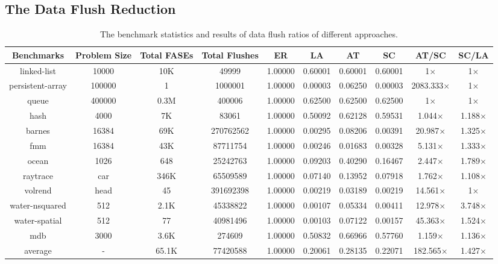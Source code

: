 \documentclass[preprint,nocopyrightspace,10pt]{sigplanconf}
\begin{document}
\subsection{The Data Flush Reduction}
\begin{table}
\small
\centering
\begin{tabular}{|c|c|c|c||c|c|c|c|c|c|}
\hline
{\bf Benchmarks} & {\bf Problem Size} & {\bf Total FASEs}& {\bf Total Flushes} & {\bf ER} & {\bf LA} & {\bf AT} & {\bf SC} & {\bf AT/SC} & {\bf SC/LA} \\ \hline \hline
linked-list & 10000 & 10K & 49999 & 1.00000 & 0.60001 & 0.60001 &  0.60001 & 1$\times$ & 1$\times$ \\ \hline
persistent-array & 100000 &  1 & 1000001 & 1.00000 &  0.00003 & 0.06250 & 0.00003 & 2083.333$\times$  & 1$\times$  \\ \hline
queue & 400000  & 0.3M &  400006 & 1.00000 &  0.62500 & 0.62500 & 0.62500 & 1$\times$  &  1$\times$  \\ \hline
hash & 4000 & 7K & 83061 & 1.00000 & 0.50092 & 0.62128 & 0.59531 & 1.044$\times$  & 1.188$\times$  \\ \hline
barnes & 16384 & 69K & 270762562 & 1.00000 & 0.00295  & 0.08206 & 0.00391 & 20.987$\times$  & 1.325$\times$  \\ \hline
fmm & 16384 & 43K & 87711754 & 1.00000 &   0.00246 & 0.01683 & 0.00328 & 5.131$\times$  & 1.333$\times$  \\ \hline
ocean & 1026 & 648 & 25242763 & 1.00000 & 0.09203  &  0.40290 & 0.16467 & 2.447$\times$  &  1.789$\times$  \\ \hline
raytrace & car & 346K & 65509589 & 1.00000 &  0.07140 &  0.13952 & 0.07918 & 1.762$\times$  & 1.108$\times$  \\ \hline
volrend & head & 45  & 391692398 & 1.00000 & 0.00219 &  0.03189 & 0.00219 & 14.561$\times$  & 1$\times$  \\ \hline
water-nsquared & 512 & 2.1K & 45338822 & 1.00000 & 0.00107 & 0.05334 & 0.00411 & 12.978$\times$  & 3.748$\times$  \\ \hline
water-spatial & 512 & 77 & 40981496 & 1.00000 & 0.00103 &  0.07122 & 0.00157 & 45.363$\times$  & 1.524$\times$  \\ \hline
mdb & 3000 & 3.6K & 274609 & 1.00000 & 0.50832 & 0.66966 & 0.57760 &1.159$\times$  & 1.136$\times$  \\ \hline \hline
average & - & 65.1K & 77420588 & 1.00000 & 0.20061 & 0.28135  & 0.22071 &  182.565$\times$ & 1.427$\times$ \\ \hline

\end{tabular}
\caption{The benchmark statistics and results of data flush ratios of different approaches.}
\label{tbl:bench}
\end{table}
\end{document}
